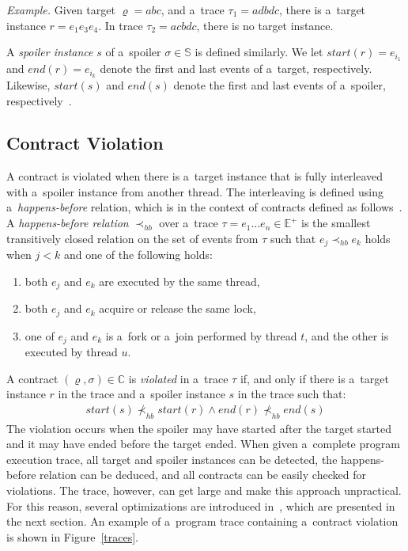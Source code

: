 \emph{Example.} Given target $\varrho = abc$, and a~trace $\tau_1 = adbdc$,
there is a~target instance $r = e_1 e_3 e_4$. In trace $\tau_2 = acbdc$, there
is no target instance.

A \emph{spoiler instance} $s$ of a~spoiler $\sigma \in \mathbb{S}$ is defined
similarly. We let $start(r) = e_{i_1}$ and $end(r) = e_{i_k}$ denote the first
and last events of a~target, respectively. Likewise, $start(s)$ and $end(s)$
denote the first and last events of a~spoiler, respectively~\cite{contracts}.

\subsection{Contract Violation}

A contract is violated when there is a~target instance that is fully interleaved
with a~spoiler instance from another thread. The interleaving is defined using
a~\emph{happens-before} relation, which is in the context of contracts defined
as follows~\cite{contracts}. A \emph{happens-before relation} $\prec_{hb}$ over
a~trace $\tau = e_1 \ldots e_n \in \mathbb{E}^+$ is the smallest transitively
closed relation on the set of events from $\tau$ such that $e_j \prec_{hb} e_k$
holds when $j < k$ and one of the following holds:
\begin{enumerate}
    \item both $e_j$ and $e_k$ are executed by the same thread,
    \item both $e_j$ and $e_k$ acquire or release the same lock,
    \item one of $e_j$ and $e_k$ is a~fork or a~join performed by thread $t$,
        and the other is executed by thread $u$.
\end{enumerate}

A contract $(\varrho,\sigma) \in \mathbb{C}$ is \emph{violated} in a~trace
$\tau$ if, and only if there is a~target instance $r$ in the trace and a~spoiler
instance $s$ in the trace such that:
\begin{align*}
    start(s) \nprec_{hb} start(r) \wedge end(r) \nprec_{hb} end(s)
\end{align*}
The violation occurs when the spoiler may have started after the target started
and it may have ended before the target ended. When given a~complete program
execution trace, all target and spoiler instances can be detected, the
happens-before relation can be deduced, and all contracts can be easily checked
for violations. The trace, however, can get large and make this approach
unpractical. For this reason, several optimizations are introduced
in~\cite{contracts}, which are presented in the next section. An example of
a~program trace containing a~contract violation is shown in Figure~\ref{traces}.

